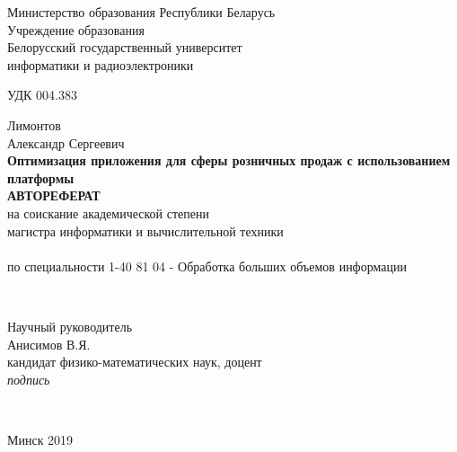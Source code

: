 \begin{titlepage}
  \begin{center}
    Министерство образования Республики Беларусь\\
    Учреждение образования\\
    Белорусский государственный университет\\ информатики и радиоэлектроники\\[2em]
  \end{center}

УДК 004.383\\[2em]

  \begin{center}
    Лимонтов\\
    Александр Сергеевич
    \\[1em]
    \textbf{Оптимизация приложения для сферы розничных продаж с использованием платформы \LB}\\[3em]
    \textbf{\large\MakeUppercase{Автореферат}}\\
    на соискание академической степени\\магистра информатики и вычислительной техники\\
    \\[1em]
    по специальности 1-40 81 04 - Обработка больших объемов информации
  \end{center}\\[2em]

  \begin{flushright}
    \begin{minipage}{0.42\textwidth}
      Научный руководитель\\
      Анисимов В.Я.\\
      кандидат физико-ма\-те\-ма\-ти\-чес\-ких наук, доцент\\[1em]
      \textit{подпись}
    \end{minipage}\\[2.2em]
  \end{flushright}

  \mbox{}
  \vfill
  \begin{center}Минск 2019\end{center}
\end{titlepage}
